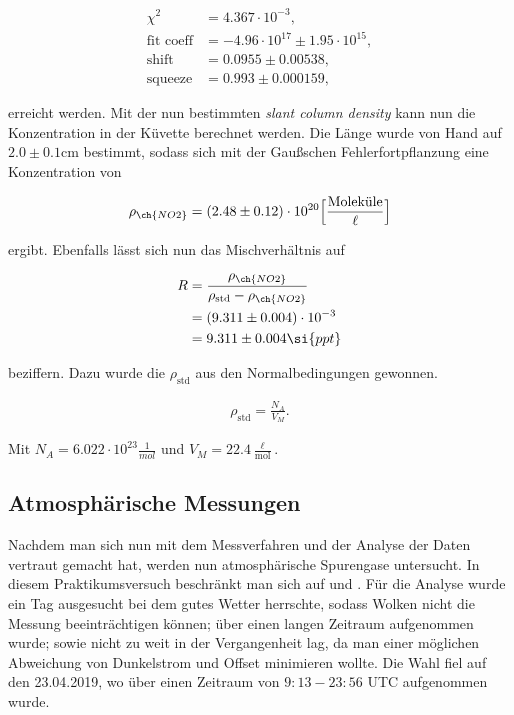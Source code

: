 \documentclass[12pt, a4paper, bibliography=totoc]{scrartcl}
\begin{document}
\begin{multicols}{2}
\begin{align}
	\chi^2 &= 4.367 \cdot 10^{-3},\\
    \text{fit coeff} &= -4.96 \cdot 10^{17} \pm 1.95 \cdot 10^{15},\\
    \text{shift} &= 0.0955 \pm 0.00538,\\
    \text{squeeze} &= 0.993 \pm 0.000159, 
\end{align}

erreicht werden.
Mit der nun bestimmten \textit{slant column density} kann nun die  Konzentration in der Küvette berechnet werden.
Die Länge wurde von Hand auf $2.0 \pm 0.1$\si{cm} bestimmt, sodass sich mit der Gaußschen Fehlerfortpflanzung eine Konzentration von

\begin{align}
    \rho_{\ch{NO2}} = (2.48 \pm 0.12) \cdot 10^{20} \Bigl[ \frac{\text{Moleküle}}{\ell}\Bigr]
\end{align}

ergibt.	
Ebenfalls lässt sich nun das Mischverhältnis auf

\begin{align}
    R &= \frac{\rho_{\ch{NO2}}}{\rho_{\text{std}}-\rho_{\ch{NO2}}}\\ 
    &= (9.311 \pm 0.004) \cdot 10^{-3}\\
    &= 9.311 \pm 0.004 \si{ppt}
\end{align}

beziffern. Dazu wurde die $\rho_{\text{std}}$ aus den Normalbedingungen gewonnen.

\begin{align}
    \rho_{\text{std}} = \frac{N_A}{V_M}.
\end{align}
 	
Mit $N_A = 6.022 \cdot 10^{23} \frac{1}{\si{mol}}$ und $V_M = 22.4 \frac{\ell}{\si{\mol}}$.

\subsection{Atmosphärische Messungen}\label{ssec:atmospheric_measurements}

Nachdem man sich nun mit dem Messverfahren und der Analyse der Daten vertraut gemacht hat, werden nun atmosphärische Spurengase untersucht. In diesem Praktikumsversuch beschränkt man sich auf  und .
Für die Analyse wurde ein Tag ausgesucht bei dem gutes Wetter herrschte, sodass Wolken nicht die Messung beeinträchtigen können; über einen langen Zeitraum aufgenommen wurde; sowie nicht zu weit in der Vergangenheit lag, da man einer möglichen Abweichung von Dunkelstrom und Offset minimieren wollte.
Die Wahl fiel auf den 23.04.2019, wo über einen Zeitraum von $9:13 - 23:56$ UTC aufgenommen wurde.


\end{multicols}
\end{document}

